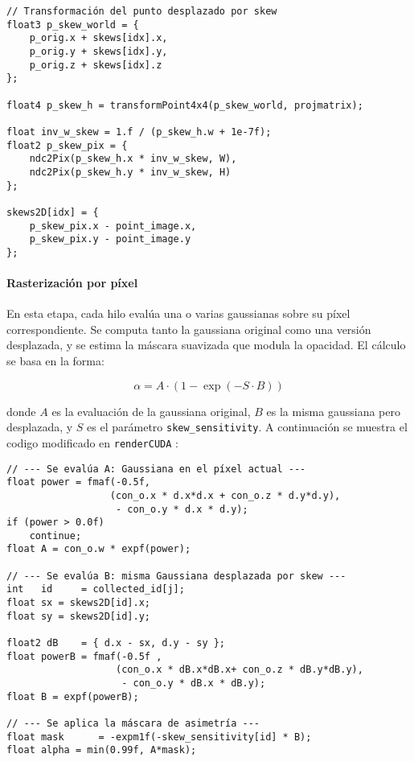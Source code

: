 \begin{verbatim}
// Transformación del punto desplazado por skew
float3 p_skew_world = {
    p_orig.x + skews[idx].x,
    p_orig.y + skews[idx].y,
    p_orig.z + skews[idx].z
};

float4 p_skew_h = transformPoint4x4(p_skew_world, projmatrix);

float inv_w_skew = 1.f / (p_skew_h.w + 1e-7f);
float2 p_skew_pix = {
    ndc2Pix(p_skew_h.x * inv_w_skew, W),
    ndc2Pix(p_skew_h.y * inv_w_skew, H)
};

skews2D[idx] = {
    p_skew_pix.x - point_image.x,
    p_skew_pix.y - point_image.y
};
\end{verbatim}

\paragraph{Rasterización por píxel}
En esta etapa, cada hilo evalúa una o varias gaussianas sobre su píxel correspondiente. Se computa tanto la gaussiana original como una versión desplazada, y se estima la máscara suavizada que modula la opacidad. El cálculo se basa en la forma:  


\[
\alpha = A \cdot \left(1 - \exp(-S \cdot B)\right)
\]

donde $A$ es la evaluación de la gaussiana original, $B$ es la misma gaussiana pero desplazada, y $S$ es el parámetro \texttt{skew\_sensitivity}. A continuación se muestra el codigo modificado en \texttt{renderCUDA} :



\begin{verbatim}
// --- Se evalúa A: Gaussiana en el píxel actual ---
float power = fmaf(-0.5f, 
                  (con_o.x * d.x*d.x + con_o.z * d.y*d.y),
                   - con_o.y * d.x * d.y);
if (power > 0.0f)
    continue;
float A = con_o.w * expf(power);

// --- Se evalúa B: misma Gaussiana desplazada por skew ---
int   id     = collected_id[j];
float sx = skews2D[id].x;
float sy = skews2D[id].y;

float2 dB    = { d.x - sx, d.y - sy };
float powerB = fmaf(-0.5f , 
                   (con_o.x * dB.x*dB.x+ con_o.z * dB.y*dB.y),
                    - con_o.y * dB.x * dB.y);
float B = expf(powerB);

// --- Se aplica la máscara de asimetría ---
float mask      = -expm1f(-skew_sensitivity[id] * B);
float alpha = min(0.99f, A*mask);
\end{verbatim}

